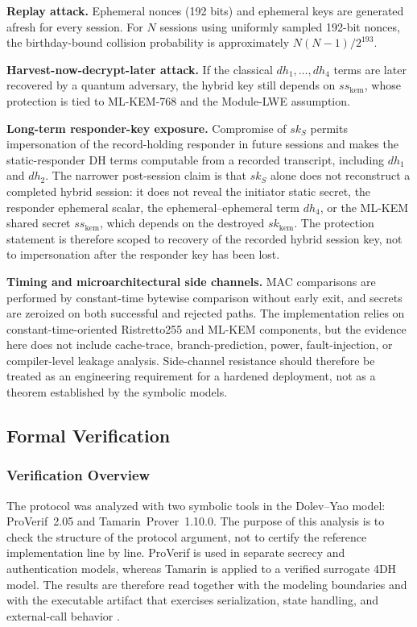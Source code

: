 \documentclass[preprint,12pt]{elsarticle}
\theoremstyle{remark}
\begin{document}
\textbf{Replay attack.} Ephemeral nonces (192 bits) and ephemeral keys
are generated afresh for every session. For $N$ sessions using uniformly
sampled 192-bit nonces, the birthday-bound collision probability is
approximately $N(N-1)/2^{193}$.

\textbf{Harvest-now-decrypt-later attack.} If the classical
$dh_1,\ldots,dh_4$ terms are later recovered by a quantum adversary, the
hybrid key still depends on $ss_{\mathrm{kem}}$, whose protection is tied
to ML-KEM-768 and the Module-LWE assumption.

\textbf{Long-term responder-key exposure.} Compromise of $sk_S$ permits
impersonation of the record-holding responder in future sessions and makes the
static-responder DH terms computable from a recorded transcript, including
$dh_1$ and $dh_2$. The narrower post-session claim is that $sk_S$ alone
does not reconstruct a completed hybrid session: it does not reveal the
initiator static secret, the responder ephemeral scalar, the
ephemeral--ephemeral term $dh_4$, or the ML-KEM shared secret
$ss_{\mathrm{kem}}$, which depends on the destroyed
$sk_{\mathrm{kem}}$. The protection statement is therefore scoped to
recovery of the recorded hybrid session key, not to impersonation after
the responder key has been lost.

\textbf{Timing and microarchitectural side channels.} MAC comparisons
are performed by constant-time bytewise comparison without early exit,
and secrets are zeroized on both successful and rejected paths. The
implementation relies on constant-time-oriented Ristretto255 and ML-KEM
components, but the evidence here does not include cache-trace,
branch-prediction, power, fault-injection, or compiler-level leakage
analysis. Side-channel resistance should therefore be treated as an
engineering requirement for a hardened deployment, not as a theorem
established by the symbolic models.

\subsection{Formal Verification}

\subsubsection{Verification Overview}

The protocol was analyzed with two symbolic tools in the Dolev--Yao
model: ProVerif~2.05 and Tamarin~Prover~1.10.0. The purpose of this
analysis is to check the structure of the protocol argument, not to
certify the reference implementation line by line. ProVerif is used in
separate secrecy and authentication models, whereas Tamarin is applied
to a verified surrogate 4DH model. The results are therefore read
together with the modeling boundaries and with the executable artifact
that exercises serialization, state handling, and external-call behavior
\cite{cremers2012,basin2018}.
\end{document}
